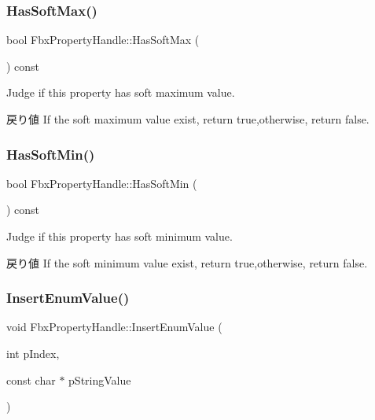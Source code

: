 \subsubsection{\texorpdfstring{Has\+Soft\+Max()}{HasSoftMax()}}
{\footnotesize\ttfamily bool Fbx\+Property\+Handle\+::\+Has\+Soft\+Max (\begin{DoxyParamCaption}{ }\end{DoxyParamCaption}) const}

Judge if this property has soft maximum value. \begin{DoxyReturn}{戻り値}
If the soft maximum value exist, return true,otherwise, return false. 
\end{DoxyReturn}
\mbox{\label{class_fbx_property_handle_a487afcc8d481a7a64b0087e2bf313c94}} 
\subsubsection{\texorpdfstring{Has\+Soft\+Min()}{HasSoftMin()}}
{\footnotesize\ttfamily bool Fbx\+Property\+Handle\+::\+Has\+Soft\+Min (\begin{DoxyParamCaption}{ }\end{DoxyParamCaption}) const}

Judge if this property has soft minimum value. \begin{DoxyReturn}{戻り値}
If the soft minimum value exist, return true,otherwise, return false. 
\end{DoxyReturn}
\mbox{\label{class_fbx_property_handle_ab7e634de872eec9ff5fa59e88a000f79}} 
\subsubsection{\texorpdfstring{Insert\+Enum\+Value()}{InsertEnumValue()}}
{\footnotesize\ttfamily void Fbx\+Property\+Handle\+::\+Insert\+Enum\+Value (\begin{DoxyParamCaption}\item[{int}]{p\+Index,  }\item[{const char $\ast$}]{p\+String\+Value }\end{DoxyParamCaption})}


